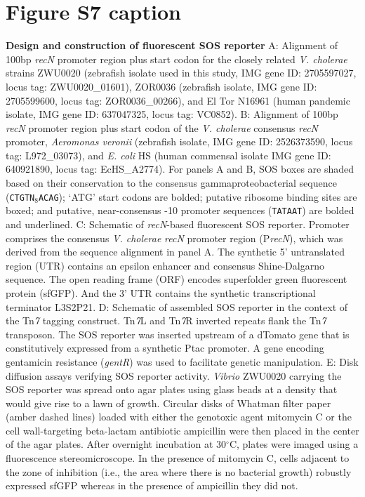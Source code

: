 \section*{Figure S7 caption}
\textbf{Design and construction of fluorescent SOS reporter} A: Alignment of 100bp \textit{recN} promoter region plus start codon for the closely related \textit{V. cholerae} strains ZWU0020 (zebrafish isolate used in this study, IMG gene ID: 2705597027, locus tag: ZWU0020\_01601), ZOR0036 (zebrafish isolate, IMG gene ID: 2705599600, locus tag: ZOR0036\_00266), and El Tor N16961 (human pandemic isolate, IMG gene ID: 637047325, locus tag: VC0852). B: Alignment of 100bp \textit{recN} promoter region plus start codon of the \textit{V. cholerae} consensus \textit{recN} promoter, \textit{Aeromonas veronii} (zebrafish isolate, IMG gene ID: 2526373590, locus tag: L972\_03073), and \textit{E. coli} HS (human commensal isolate IMG gene ID: 640921890, locus tag: EcHS\_A2774). For panels A and B, SOS boxes are shaded based on their conservation to the consensus gammaproteobacterial sequence (\texttt{CTGTN$_8$ACAG}); `ATG' start codons are bolded; putative ribosome binding sites are boxed; and putative, near-consensus -10 promoter sequences (\texttt{TATAAT}) are bolded and underlined. C: Schematic of \textit{recN}-based fluorescent SOS reporter. Promoter comprises the consensus \textit{V. cholerae} \textit{recN} promoter region (P\textit{recN}), which was derived from the sequence alignment in panel A. The synthetic 5' untranslated region (UTR) contains an epsilon enhancer and consensus Shine-Dalgarno sequence. The open reading frame (ORF) encodes superfolder green fluorescent protein (sfGFP). And the 3' UTR contains the synthetic transcriptional terminator L3S2P21. D: Schematic of assembled SOS reporter in the context of the Tn\textit{7} tagging construct. Tn\textit{7}L and Tn\textit{7}R inverted repeats flank the Tn\textit{7} transposon. The SOS reporter was inserted upstream of a dTomato gene that is constitutively expressed from a synthetic Ptac promoter. A gene encoding gentamicin resistance (\textit{gentR}) was used to facilitate genetic manipulation. E: Disk diffusion assays verifying SOS reporter activity. \textit{Vibrio} ZWU0020 carrying the SOS reporter was spread onto agar plates using glass beads at a density that would give rise to a lawn of growth. Circular disks of Whatman filter paper (amber dashed lines) loaded with either the genotoxic agent mitomycin C or the cell wall-targeting beta-lactam antibiotic ampicillin were then placed in the center of the agar plates. After overnight incubation at 30$^{\circ}$C, plates were imaged using a fluorescence stereomicroscope. In the presence of mitomycin C, cells adjacent to the zone of inhibition (i.e., the area where there is no bacterial growth) robustly expressed sfGFP whereas in the presence of ampicillin they did not.    



